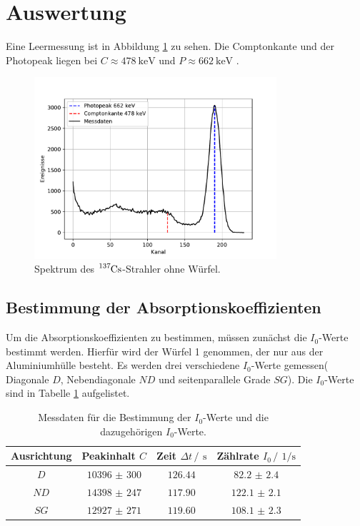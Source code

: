 \section{Auswertung}
\label{sec:Auswertung}

Eine Leermessung ist in Abbildung \ref{fig:Leer} zu sehen. Die Comptonkante und der Photopeak liegen bei $C\approx \SI{478}{\kilo\eV}$ und 
$P\approx\SI{662}{\kilo\eV}$ \cite{Lit_Wert_Comp}.

\begin{figure}
    \centering
    \includegraphics[width=0.8\textwidth]{figure/Leer.pdf}
    \caption{Spektrum des $\ce{^137Cs}$-Strahler ohne Würfel.}
    \label{fig:Leer}
\end{figure}

\subsection{Bestimmung der Absorptionskoeffizienten}

Um die Absorptionskoeffizienten zu bestimmen, müssen zunächst die $I_0$-Werte bestimmt werden. 
Hierfür wird der Würfel 1 genommen, der nur aus der Aluminiumhülle besteht. Es werden drei 
verschiedene $I_0$-Werte gemessen( Diagonale $D$, Nebendiagonale $ND$ und seitenparallele Grade $SG$).
Die $I_0$-Werte sind in Tabelle \ref{tab:I_0} aufgelistet.

\FloatBarrier
\begin{table}
    \centering
    \caption{Messdaten für die Bestimmung der $I_0$-Werte und die dazugehörigen $I_0$-Werte.}
    \label{tab:I_0}
    \begin{tabular}{c c c c}
        \toprule
        Ausrichtung&Peakinhalt $C$&Zeit $\Delta t \,/\,\SI{}{\second}$&Zählrate $I_0 \,/\,\SI{}{1\per\second}$\\
        \midrule
        $D$ &$\num{10396(300)}$&$\num{126.44}$&$\num{82.2(24)}$\\
        $ND$&$\num{14398(247)}$&$\num{117.90}$&$\num{122.1(21)}$\\
        $SG$&$\num{12927(271)}$&$\num{119.60}$&$\num{108.1(23)}$\\
        \bottomrule
    \end{tabular}
\end{table}
\FloatBarrier

